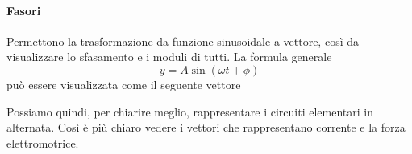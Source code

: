 \paragraph{Fasori}
Permettono la trasformazione da funzione sinusoidale a vettore, così da visualizzare lo sfasamento
e i moduli di tutti. La formula generale
\begin{equation*}
  y = A\sin(\omega t+\phi)
\end{equation*}
può essere visualizzata come il seguente vettore
\begin{center}
\end{center}
Possiamo quindi, per chiarire meglio, rappresentare i circuiti elementari in alternata. Così è
più chiaro vedere i vettori che rappresentano corrente e la forza elettromotrice.

